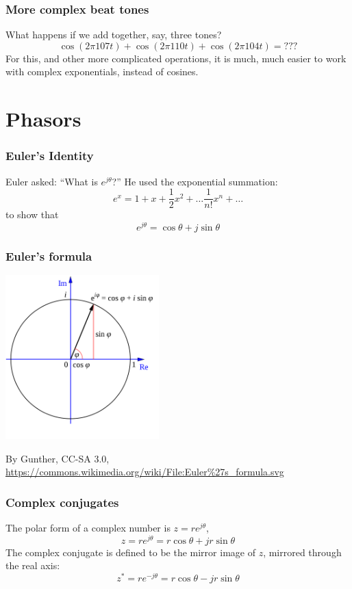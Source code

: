 \documentclass{beamer}
\begin{document}
\begin{frame}
  \frametitle{More complex beat tones}

  What happens if we add together, say, three tones?
  \[
  \cos(2\pi 107t) + \cos(2\pi 110t)+\cos(2\pi 104t)=\mbox{???}
  \]
  For this, and other more complicated operations, it
  is much, much easier to work with complex exponentials, instead of cosines.
\end{frame}
  

\section[Phasors]{Phasors}
\setcounter{subsection}{1}

\begin{frame}
  \frametitle{Euler's Identity}

  Euler asked: ``What is $e^{j\theta}$?''  He used the exponential summation:
  \[
  e^{x} = 1 + x + \frac{1}{2}x^2 + \ldots \frac{1}{n!} x^n+\ldots
  \]
  to show that
  \[
  e^{j\theta} = \cos\theta + j\sin\theta
  \]
\end{frame}

\begin{frame}
  \frametitle{Euler's formula}

  \centerline{\includegraphics[height=2.5in]{Euler.png}}
  \begin{tiny}
    By Gunther, CC-SA 3.0,
    \url{https://commons.wikimedia.org/wiki/File:Euler\%27s_formula.svg}
  \end{tiny}
\end{frame}

\begin{frame}
  \frametitle{Complex conjugates}

  The polar form of a complex number is $z=re^{j\theta}$,
  \[
  z = re^{j\theta} = r\cos\theta + jr\sin\theta
  \]
  The complex conjugate is defined to be the mirror image of $z$,
  mirrored through the real axis:
  \[
  z^* = re^{-j\theta} = r\cos\theta - jr\sin\theta
  \]
\end{frame}
\end{document}
